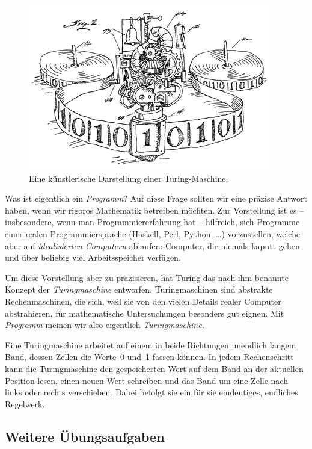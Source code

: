 \documentclass[twoside]{../zirkelblatt1415}
\theoremstyle{definition}
\theoremstyle{plain}
\theoremstyle{remark}
\begin{document}
\setlength{\wrapoverhang}{1cm}
\setlength{\columnsep}{0.5cm}
\begin{figure}
  \vspace{-3em}
  \includegraphics[scale=0.3]{turing-machine}
  \scriptsize
  Eine künstlerische Darstellung einer
  Turing-Maschine.\footnotemark
\end{figure}

Was ist eigentlich ein \emph{Programm}? Auf diese Frage sollten wir eine
präzise Antwort haben, wenn wir rigoros Mathematik betreiben möchten. Zur
Vorstellung ist es -- insbesondere, wenn man Programmiererfahrung hat --
hilfreich, sich Programme einer realen Programmiersprache (Haskell, Perl,
Python, \ldots) vorzustellen, welche aber auf \emph{idealisierten Computern}
ablaufen: Computer, die niemals kaputt gehen und über beliebig viel
Arbeitsspeicher verfügen.

Um diese Vorstellung aber zu präzisieren, hat Turing das nach ihm benannte
Konzept der \emph{Turingmaschine} entworfen. Turingmaschinen sind abstrakte
Rechenmaschinen, die sich, weil sie von den vielen Details realer Computer
abstrahieren, für mathematische Untersuchungen besonders gut eignen. Mit
\emph{Programm} meinen wir also eigentlich \emph{Turingmaschine}.

Eine Turingmaschine arbeitet auf einem in beide Richtungen unendlich langem
Band, dessen Zellen die Werte~0 und~1 fassen können.
In jedem Rechenschritt kann die
Turingmaschine den gespeicherten Wert auf dem Band an der aktuellen Position
lesen, einen neuen Wert schreiben und das Band um eine Zelle nach links oder
rechts verschieben. Dabei befolgt sie ein für sie eindeutiges, endliches
Regelwerk.


\subsection{Weitere Übungsaufgaben}
\end{document}
